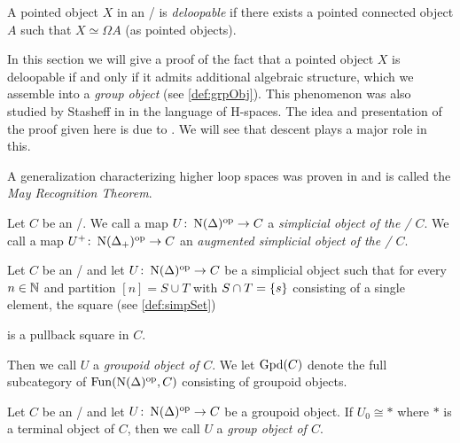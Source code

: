 A pointed object $X$ in an \inftytop/ is \emph{deloopable} if there exists a pointed connected object $A$ such that $X\simeq\Omega A$ (as pointed objects).

In this section we will give a proof of the fact that a pointed object $X$ is deloopable if and only if it admits additional algebraic structure, which we assemble into a \emph{group object} (see \cref{def:grpObj}).
This phenomenon was also studied by Stasheff in \cite{stasheff_hspaces} in the language of H-spaces.
The idea and presentation of the proof given here is due to \cite{segal_cat_and_cohom}.
We will see that descent plays a major role in this.

A generalization characterizing higher loop spaces was proven in \cite{may2006geometry} and is called the \emph{May Recognition Theorem}.
\begin{definition}
    Let $C$ be an \inftycat/. 
    We call a map $U\colon\operatorname{N}(\Delta)^{\operatorname{op}}\to C$ a \emph{simplicial object of the \inftycat/ $C$}.
    We call a map $U^+\colon\operatorname{N}(\Delta_+)^{\operatorname{op}}\to C$ an \emph{augmented simplicial object of the \inftycat/ $C$}.
\end{definition}
\begin{definition}
    Let $C$ be an \inftycat/ and let $U\colon\operatorname{N}(\Delta)^{\operatorname{op}}\to C$ be a simplicial object such that for every $n\in\mathbb{N}$ and partition $[n]=S\cup T$ with $S\cap T=\left\lbrace s\right\rbrace$ consisting of a single element, the square (see \cref{def:simpSet})  %
    \begin{center}
    \end{center}
    is a pullback square in $C$.

    Then we call $U$ a \emph{groupoid object of $C$}.
    We let $\operatorname{Gpd}(C)$ denote the full subcategory of $\operatorname{Fun}(\operatorname{N}(\Delta)^{\operatorname{op}},C)$ consisting of groupoid objects.
\end{definition}
\begin{definition}\label{def:grpObj}
    Let $C$ be an \inftycat/ and let $U\colon\operatorname{N}(\Delta)^{\operatorname{op}}\to C$ be a groupoid object.
    If $U_0\cong *$ where $*$ is a terminal object of $C$, then we call $U$ a \emph{group object of $C$}.
\end{definition}
